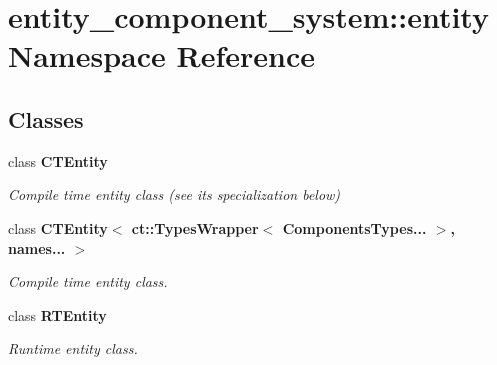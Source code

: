 \section{entity\+\_\+component\+\_\+system\+:\+:entity Namespace Reference}
\label{namespaceentity__component__system_1_1entity}
\subsection*{Classes}
\begin{DoxyCompactItemize}
\item 
class {\bf C\+T\+Entity}
\begin{DoxyCompactList}\small\item\em Compile time entity class (see its specialization below) \end{DoxyCompactList}\item 
class {\bf C\+T\+Entity$<$ ct\+::\+Types\+Wrapper$<$ Components\+Types... $>$, names... $>$}
\begin{DoxyCompactList}\small\item\em Compile time entity class. \end{DoxyCompactList}\item 
class {\bf R\+T\+Entity}
\begin{DoxyCompactList}\small\item\em Runtime entity class. \end{DoxyCompactList}\end{DoxyCompactItemize}
